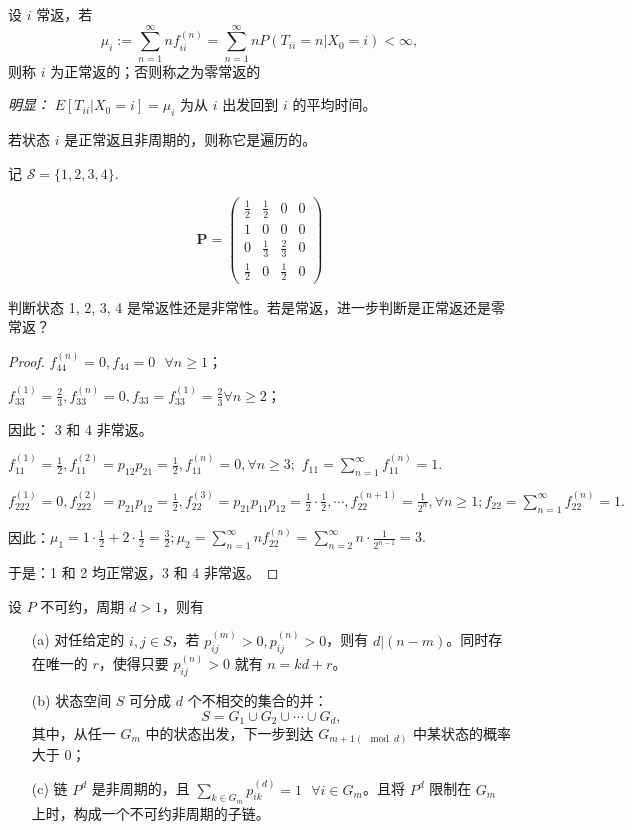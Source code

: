 \documentclass[lang=cn,10pt,thmcnt=section]{elegantbook}
\begin{document}
\begin{definition}[正常返状态]
设 $i$ 常返，若
\[
\mu_i := \sum_{n=1}^{\infty} n f_{ii}^{(n)} = \sum_{n=1}^{\infty} n P(T_{ii} = n | X_0 = i) < \infty,
\]
则称 $i$ 为正常返的；否则称之为零常返的
\end{definition}

\textit{明显：} $E[T_{ii} | X_0 = i] = \mu_i$ 为从 $i$ 出发回到 $i$ 的平均时间。
\begin{definition}[遍历性]
	若状态 $i$ 是正常返且非周期的，则称它是遍历的。
\end{definition}
\begin{example}
	记 $\mathcal{S} = \{1, 2, 3, 4\}$.

\[
\mathbf{P} = \left(
\begin{array}{cccc}
\frac{1}{2} & \frac{1}{2} & 0 & 0  \\
1 & 0 & 0 & 0 \\
0 & \frac{1}{3} & \frac{2}{3} & 0 \\
\frac{1}{2} & 0 & \frac{1}{2} & 0
\end{array}
\right)
\]

判断状态 1, 2, 3, 4 是常返性还是非常性。若是常返，进一步判断是正常返还是零常返？
\end{example}
\begin{proof}
	$f_{44}^{(n)} = 0, f_{44} = 0 \ \ \ \forall n \geq 1$；

	 $f_{33}^{(1)} = \frac{2}{3}, f_{33}^{(n)} = 0, f_{33} = f_{33}^{(1)} = \frac{2}{3} \forall n \geq 2$；

	因此：
	3 和 4 非常返。


	$f_{11}^{(1)} = \frac{1}{2}, f_{11}^{(2)} = p_{12} p_{21} = \frac{1}{2}, f_{11}^{(n)} = 0, \forall n \geq 3;$
	$f_{11} = \sum_{n=1}^{\infty} f_{11}^{(n)} = 1.$
	
	 $f_{222}^{(1)} = 0, f_{222}^{(2)} = p_{21} p_{12} = \frac{1}{2}, f_{22}^{(3)} = p_{21} p_{11} p_{12} = \frac{1}{2} \cdot \frac{1}{2}, \cdots, f_{22}^{(n+1)} = \frac{1}{2^n}, \forall n \geq 1; f_{22} = \sum_{n=1}^{\infty} f_{22}^{(n)} = 1.$
	
	因此：$\mu_1 = 1 \cdot \frac{1}{2} + 2 \cdot \frac{1}{2} = \frac{3}{2}; \mu_2 = \sum_{n=1}^{\infty} n f_{22}^{(n)} = \sum_{n=2}^{\infty} n \cdot \frac{1}{2^{n-1}} = 3.$
	
	于是：1 和 2 均正常返，3 和 4 非常返。
\end{proof}
\begin{theorem}
	设 $P$ 不可约，周期 $d > 1$，则有
\begin{enumerate}
    \item[(a)] 对任给定的 $i, j \in S$，若 $p_{ij}^{(m)} > 0, p_{ij}^{(n)} > 0$，则有 $d|(n-m)$。同时存在唯一的 $r$，使得只要 $p_{ij}^{(n)} > 0$ 就有 $n = kd + r$。
    \item[(b)] 状态空间 $S$ 可分成 $d$ 个不相交的集合的并：
    \[
    S = G_1 \cup G_2 \cup \cdots \cup G_d,
    \]
    其中，从任一 $G_m$ 中的状态出发，下一步到达 $G_{m+1(\mod d)}$ 中某状态的概率大于 $0$；
    \item[(c)] 链 $P^d$ 是非周期的，且 $\sum_{k \in G_m} p_{ik}^{(d)} = 1 \ \ \ \forall i \in G_m$。且将 $P^d$ 限制在 $G_m$ 上时，构成一个不可约非周期的子链。
\end{enumerate}

\end{theorem}
\end{document}
